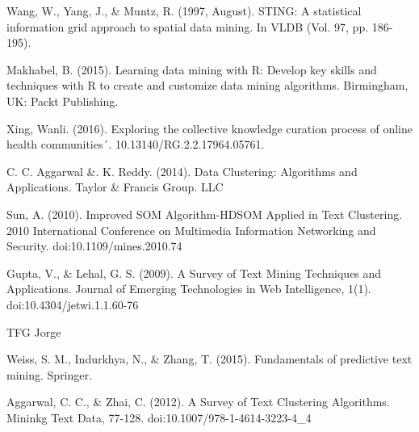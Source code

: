 \documentclass[10pt, a4paper]{article}
\begin{document}
\begin{thebibliography}{X}
 Wang, W., Yang, J., \& Muntz, R. (1997, August). STING: A statistical information grid approach to spatial data mining. In VLDB (Vol. 97, pp. 186-195).

 Makhabel, B. (2015). Learning data mining with R: Develop key skills and techniques with R to create and customize data mining algorithms. Birmingham, UK: Packt Publishing.

 Xing, Wanli. (2016). Exploring the collective knowledge curation process of online health communities´. 10.13140/RG.2.2.17964.05761. 

 C. C. Aggarwal \&. K. Reddy. (2014). Data Clustering: Algorithms and Applications. Taylor \& Francis Group. LLC

 Sun, A. (2010). Improved SOM Algorithm-HDSOM Applied in Text Clustering. 2010 International Conference on Multimedia Information Networking and Security. doi:10.1109/mines.2010.74

 Gupta, V., \& Lehal, G. S. (2009). A Survey of Text Mining Techniques and Applications. Journal of Emerging Technologies in Web Intelligence, 1(1). doi:10.4304/jetwi.1.1.60-76

 TFG Jorge

 Weiss, S. M., Indurkhya, N., \& Zhang, T. (2015). Fundamentals of predictive text mining. Springer.

 Aggarwal, C. C., \& Zhai, C. (2012). A Survey of Text Clustering Algorithms. Mininkg Text Data, 77-128. doi:10.1007/978-1-4614-3223-4\_4

\end{thebibliography}    
    
\clearpage

    
  
\end{document}
